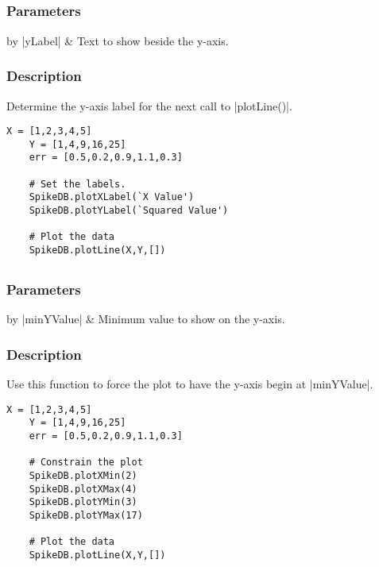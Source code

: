 \documentclass{report}
\begin{document}
\clearpage
\subsection{}
\subsubsection{Parameters}
\begin{table}[h]
\begin{center}
\begin{tabular}{by}
		|yLabel| & Text to show beside the y-axis. \\
	\end{tabular}
\end{center}
\end{table}
\subsubsection{Description}
Determine the y-axis label for the next call to |plotLine()|.
\begin{lstlisting}[caption=Example]
	X = [1,2,3,4,5]
	Y = [1,4,9,16,25]
	err = [0.5,0.2,0.9,1.1,0.3]

	# Set the labels.
	SpikeDB.plotXLabel(`X Value')
	SpikeDB.plotYLabel(`Squared Value')

	# Plot the data
	SpikeDB.plotLine(X,Y,[])
\end{lstlisting}


\clearpage
\subsection{}
\subsubsection{Parameters}
\begin{table}[h]
\begin{center}
\begin{tabular}{by}
		|minYValue| & Minimum value to show on the y-axis.\\
	\end{tabular}
\end{center}
\end{table}
\subsubsection{Description}
Use this function to force the plot to have the y-axis begin at |minYValue|.
\begin{lstlisting}[caption=Example]
	X = [1,2,3,4,5]
	Y = [1,4,9,16,25]
	err = [0.5,0.2,0.9,1.1,0.3]

	# Constrain the plot
	SpikeDB.plotXMin(2)
	SpikeDB.plotXMax(4)
	SpikeDB.plotYMin(3)
	SpikeDB.plotYMax(17)

	# Plot the data
	SpikeDB.plotLine(X,Y,[])
\end{lstlisting}
\end{document}
